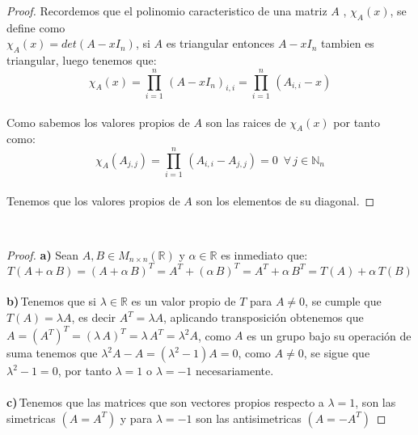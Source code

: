 \documentclass[11pt]{article}
\newcommand{\R}{\mathbb{R}}
\newcommand{\N}{\mathbb{N}}
\begin{document}
\begin{proof}
    Recordemos que el polinomio caracteristico de una matriz $A$ , $\chi_{A}(x)$, se define como\\
    $\chi_{A}(x)=det(A-xI_n)$, si $A$ es triangular entonces $A-xI_n$ tambien es triangular, luego tenemos que:\,\\
    \begin{equation*}
        \chi_{A}(x)=\prod_{i=1}^{n}\,(A-xI_n)_{i,i}=\prod_{i=1}^{n}\,(A_{i,i}-x)
    \end{equation*}\,\\
    Como sabemos los valores propios de $A$ son las raices de $\chi_A(x)$ por tanto como:\,\\
    \begin{equation*}
        \chi_{A}(A_{j,j})=\prod_{i=1}^{n}\,(A_{i,i}-A_{j,j})=0\,\,\,\forall\,j\in \N_n
    \end{equation*}\,\\
    Tenemos que los valores propios de $A$ son los elementos de su diagonal.
\end{proof}\,\\

\begin{proof}
    \textbf{a)}\,\,Sean $A,B\in M_{n\times n}(\R)$ y $\alpha\in \R$ es inmediato que:\,\\
    \begin{equation*}
        T(A+\alpha\,B)=(A+\alpha\,B)^{T}=A^{T}+(\alpha\,B)^{T}=A^{T}+\alpha\,B^{T}=T(A)+\alpha\,T(B)    
    \end{equation*}\,\\
    \textbf{b)}\,Tenemos que si $\lambda\in \R$ es un valor propio de $T$ para $A\neq 0$, se cumple que $T(A)=\lambda A$, es decir $A^{T}=\lambda A$, aplicando transposici\'on obtenemos que $A=(A^T)^{T}=(\lambda\,A)^{T}=\lambda\,A^T=\lambda^{2}A$, como 
    $A$ es un grupo bajo su operaci\'on de suma tenemos que $\lambda^2 A- A=(\lambda^2-1)A=0$, como $A\neq 0$, se sigue que $\lambda^2-1=0$, por tanto $\lambda=1$ o $\lambda=-1$ necesariamente.\,\\
    \,\\
    \textbf{c)}\,Tenemos que las matrices que son vectores propios respecto a $\lambda=1$, son las simetricas $(A=A^T)$ y para $\lambda=-1$ son las antisimetricas $(A=-A^T)$ 
\end{proof}\,\\
\end{document}
